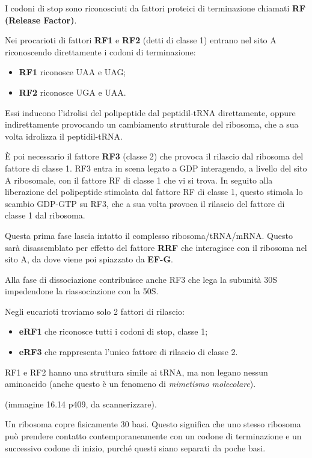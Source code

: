 \documentclass[11pt]{book}
\begin{document}
I codoni di stop sono riconosciuti da fattori proteici di terminazione
chiamati \textbf{RF (Release Factor)}.

Nei procarioti di fattori \textbf{RF1} e \textbf{RF2} (detti di classe
1) entrano nel sito A riconoscendo direttamente i codoni di
terminazione:

\begin{itemize}
\itemsep1pt\parskip0pt
\item
  \textbf{RF1} riconosce UAA e UAG;
\item
  \textbf{RF2} riconosce UGA e UAA.
\end{itemize}

Essi inducono l'idrolisi del polipeptide dal peptidil-tRNA direttamente,
oppure indirettamente provocando un cambiamento strutturale del
ribosoma, che a sua volta idrolizza il peptidil-tRNA.

È poi necessario il fattore \textbf{RF3} (classe 2) che provoca il
rilascio dal ribosoma del fattore di classe 1. RF3 entra in scena legato
a GDP interagendo, a livello del sito A ribosomale, con il fattore RF di
classe 1 che vi si trova. In seguito alla liberazione del polipeptide
stimolata dal fattore RF di classe 1, questo stimola lo scambio GDP-GTP
su RF3, che a sua volta provoca il rilascio del fattore di classe 1 dal
ribosoma.

Questa prima fase lascia intatto il complesso ribosoma/tRNA/mRNA. Questo
sarà disassemblato per effetto del fattore \textbf{RRF} che interagisce
con il ribosoma nel sito A, da dove viene poi spiazzato da
\textbf{EF-G}.

Alla fase di dissociazione contribuisce anche RF3 che lega la subunità
30S impedendone la riassociazione con la 50S.

Negli eucarioti troviamo solo 2 fattori di rilascio:

\begin{itemize}
\itemsep1pt\parskip0pt
\item
  \textbf{eRF1} che riconosce tutti i codoni di stop, classe 1;
\item
  \textbf{eRF3} che rappresenta l'unico fattore di rilascio di classe 2.
\end{itemize}

RF1 e RF2 hanno una struttura simile ai tRNA, ma non legano nessun
aminoacido (anche questo è un fenomeno di \emph{mimetismo molecolare}).

(immagine 16.14 p409, da scannerizzare).

Un ribosoma copre fisicamente 30 basi. Questo significa che uno stesso
ribosoma può prendere contatto contemporaneamente con un codone di
terminazione e un successivo codone di inizio, purché questi siano
separati da poche basi.
\end{document}
